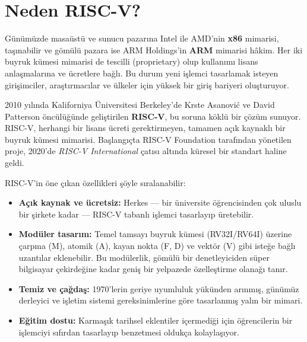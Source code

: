 \section{Neden RISC-V?}
\label{sec:neden-riscv}

Günümüzde masaüstü ve sunucu pazarına Intel ile AMD'nin \textbf{x86} mimarisi, taşınabilir ve gömülü pazara ise ARM Holdings'in \textbf{ARM} mimarisi hâkim. Her iki buyruk kümesi mimarisi de tescilli (proprietary) olup kullanımı lisans anlaşmalarına ve ücretlere bağlı. Bu durum yeni işlemci tasarlamak isteyen girişimciler, araştırmacılar ve ülkeler için yüksek bir giriş bariyeri oluşturuyor.

2010 yılında Kaliforniya Üniversitesi Berkeley'de Krste Asanovi\'{c} ve David Patterson öncülüğünde geliştirilen \textbf{RISC-V}, bu soruna köklü bir çözüm sunuyor. RISC-V, herhangi bir lisans ücreti gerektirmeyen, tamamen açık kaynaklı bir buyruk kümesi mimarisi. Başlangıçta RISC-V Foundation tarafından yönetilen proje, 2020'de \emph{RISC-V International} çatısı altında küresel bir standart haline geldi.

RISC-V'in öne çıkan özellikleri şöyle sıralanabilir:
\begin{itemize}
    \item \textbf{Açık kaynak ve ücretsiz:} Herkes --- bir üniversite öğrencisinden çok uluslu bir şirkete kadar --- RISC-V tabanlı işlemci tasarlayıp üretebilir.
    \item \textbf{Modüler tasarım:} Temel tamsayı buyruk kümesi (RV32I/RV64I) üzerine çarpma (M), atomik (A), kayan nokta (F, D) ve vektör (V) gibi isteğe bağlı uzantılar eklenebilir. Bu modülerlik, gömülü bir denetleyiciden süper bilgisayar çekirdeğine kadar geniş bir yelpazede özelleştirme olanağı tanır.
    \item \textbf{Temiz ve çağdaş:} 1970'lerin geriye uyumluluk yükünden arınmış, günümüz derleyici ve işletim sistemi gereksinimlerine göre tasarlanmış yalın bir mimari.
    \item \textbf{Eğitim dostu:} Karmaşık tarihsel eklentiler içermediği için öğrencilerin bir işlemciyi sıfırdan tasarlayıp benzetmesi oldukça kolaylaşıyor.
\end{itemize}

